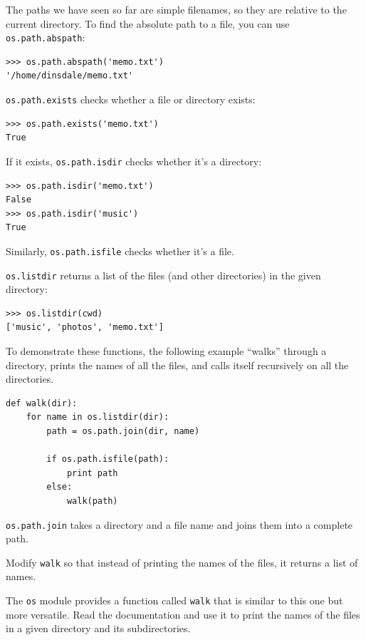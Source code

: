 The paths we have seen so far are simple filenames, so they are
relative to the current directory.  To find the absolute path to
a file, you can use {\tt os.path.abspath}:

\beforeverb
\begin{verbatim}
>>> os.path.abspath('memo.txt')
'/home/dinsdale/memo.txt'
\end{verbatim}
\afterverb
%
{\tt os.path.exists} checks
whether a file or directory exists:


\beforeverb
\begin{verbatim}
>>> os.path.exists('memo.txt')
True
\end{verbatim}
\afterverb
%
If it exists, {\tt os.path.isdir} checks whether it's a directory:

\beforeverb
\begin{verbatim}
>>> os.path.isdir('memo.txt')
False
>>> os.path.isdir('music')
True
\end{verbatim}
\afterverb
%
Similarly, {\tt os.path.isfile} checks whether it's a file.

{\tt os.listdir} returns a list of the files (and other directories)
in the given directory:

\beforeverb
\begin{verbatim}
>>> os.listdir(cwd)
['music', 'photos', 'memo.txt']
\end{verbatim}
\afterverb
%
To demonstrate these functions, the following example
``walks'' through a directory, prints
the names of all the files, and calls itself recursively on
all the directories.


\beforeverb
\begin{verbatim}
def walk(dir):
    for name in os.listdir(dir):
        path = os.path.join(dir, name)

        if os.path.isfile(path):
            print path
        else:
            walk(path)
\end{verbatim}
\afterverb
%
{\tt os.path.join} takes a directory and a file name and joins
them into a complete path.  

\begin{ex}
Modify {\tt walk} so that instead of printing the names of
the files, it returns a list of names.
\end{ex}

\begin{ex}
The {\tt os} module provides a function called {\tt walk}
that is similar to this one but more versatile.  Read
the documentation and use it to print the names of the
files in a given directory and its subdirectories.
\end{ex}


